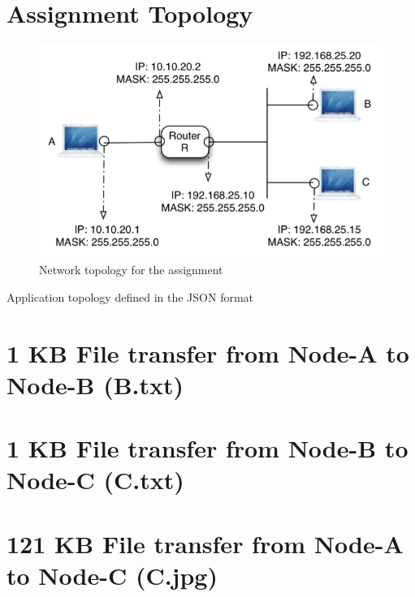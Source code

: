 \documentclass{scrartcl}
\begin{document}
\newpage
\appendix
\section{Assignment Topology} \label{appendix:topology}
\begin{figure}[H]
\centering
\includegraphics[scale=.65]{topology.png}
\caption{Network topology for the assignment}
\label{fig:topo}
\end{figure}
\bigskip

\centering\small{Application topology defined in the JSON format}
\newpage
\section{1 KB File transfer from Node-A to Node-B (B.txt)} \label{appendix:runfirst}

\newpage
\section{1 KB File transfer from Node-B to Node-C (C.txt)}

\newpage
\section{121 KB File transfer from Node-A to Node-C (C.jpg)}

\newpage
\end{document}
